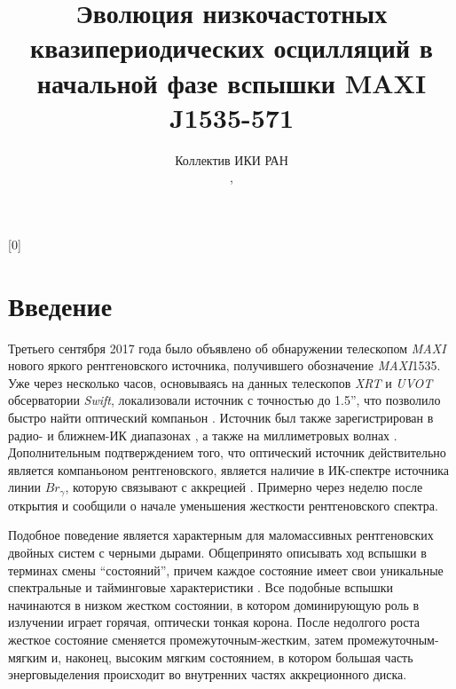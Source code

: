 \documentclass{pazhb}
\def\maxi1535{MAXI\,J1535-571}
\def\maxi{{\em MAXI}}
\begin{document}
[0]

\title{Эволюция низкочастотных квазипериодических осцилляций в начальной фазе вспышки MAXI J1535-571 }

\author{
  Коллектив ИКИ РАН\address{1},
}

\shortauthor{}




\begin{abstract}

  
  \keywords{}

\end{abstract}




\section{Введение}
Третьего сентября 2017 года \cite{negoro17ATel10699} было объявлено об обнаружении телескопом \maxi\, \citep{matsuoka09,negoro16} нового яркого рентгеновского источника, получившего обозначение \maxi1535. Уже через несколько часов, основываясь на данных телескопов {\em XRT} и {\em UVOT} обсерватории {\em Swift}, \cite{kennea17ATel10700} локализовали источник с точностью до 1.5'', что позволило быстро найти оптический компаньон \citep{scaringi17ATel10702}. Источник был также зарегистрирован в радио- \citep{russel17ATel10711} и ближнем-ИК диапазонах \citep{dincer17ATel10716}, а также на миллиметровых волнах \citep{tetarenko17ATel10745}. Дополнительным подтверждением того, что оптический источник действительно является компаньоном рентгеновского, является наличие в ИК-спектре источника линии $Br_{\gamma}$, которую связывают с аккрецией \citep{bandyopadhyay97}. Примерно через неделю после открытия \cite{nakahira17ATel10729} и \cite{kennea17ATel10731} сообщили о начале уменьшения жесткости рентгеновского спектра. 

Подобное поведение является характерным для маломассивных рентгеновских двойных систем с черными дырами. Общепринято описывать ход вспышки в терминах смены ``состояний'', причем каждое состояние имеет свои уникальные спектральные и тайминговые характеристики \citep[подробнее см.][и многие другие]{tanaka96,grebenev97,remillard06,belloni10}. Все подобные вспышки начинаются в низком жестком состоянии, в котором доминирующую роль в излучении играет горячая, оптически тонкая корона. После недолгого роста жесткое состояние сменяется промежуточным-жестким, затем промежуточным-мягким и, наконец, высоким мягким состоянием, в котором большая часть энерговыделения происходит во внутренних частях аккреционного диска. 
\end{document}
